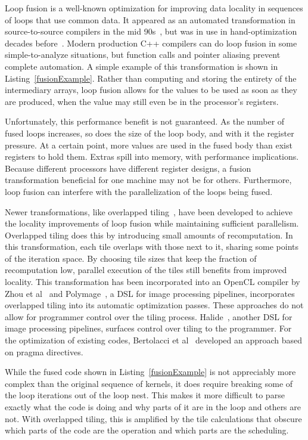 Loop fusion is a well-known optimization for improving data locality in sequences of loops that use common data.
It appeared as an automated transformation in source-to-source compilers in the mid 90s~\cite{mckinley1996improving}, but was in use in hand-optimization decades before~\cite{warren1984hierarchical,cocke1971catalogue}.
Modern production C++ compilers can do loop fusion in some simple-to-analyze situations, but function calls and pointer aliasing prevent complete automation.
A simple example of this transformation is shown in Listing~\ref{fusionExample}.
Rather than computing and storing the entirety of the intermediary arrays, loop fusion allows for the values to be used as soon as they are produced, when the value may still even be in the processor's registers.

Unfortunately, this performance benefit is not guaranteed.
As the number of fused loops increases, so does the size of the loop body, and with it the register pressure. 
At a certain point, more values are used in the fused body than exist registers to hold them.
Extras spill into memory, with performance implications.
Because different processors have different register designs, a fusion transformation beneficial for one machine may not be for others.
Furthermore, loop fusion can interfere with the parallelization of the loops being fused.

Newer transformations, like overlapped tiling~\cite{holewinski2012high,krishnamoorthy2007effective}, have been developed to achieve the locality improvements of loop fusion while maintaining sufficient parallelism.
Overlapped tiling does this by introducing small amounts of recomputation.
In this transformation, each tile overlaps with those next to it, sharing some points of the iteration space.
By choosing tile sizes that keep the fraction of recomputation low, parallel execution of the tiles still benefits from improved locality.
This transformation has been incorporated into an OpenCL compiler by Zhou et al~\cite{zhou2012hierarchical} and Polymage~\cite{mullapudi2015polymage}, a DSL for image processing pipelines, incorporates overlapped tiling into its automatic optimization passes.
These approaches do not allow for programmer control over the tiling process.
Halide~\cite{ragan-kelley2013halide}, another DSL for image processing pipelines, surfaces control over tiling to the programmer.
For the optimization of existing codes, Bertolacci et al~\cite{bertolacci2019using} developed an approach based on pragma directives.

While the fused code shown in Listing~\ref{fusionExample} is not appreciably more complex than the original sequence of kernels, it does require breaking some of the loop iterations out of the loop nest.
This makes it more difficult to parse exactly what the code is doing and why parts of it are in the loop and others are not.
With overlapped tiling, this is amplified by the tile calculations that obscure which parts of the code are the operation and which parts are the scheduling. 

